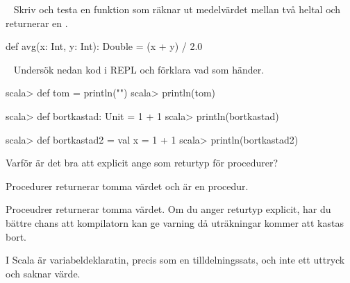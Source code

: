 \SubtaskSolved  {}

\QUESTEND






\QUESTBEGIN

\Task  \what~ Skriv och testa en funktion  som räknar ut medelvärdet mellan två heltal och returnerar en .

\SOLUTION

\TaskSolved \what

\begin{Code}
def avg(x: Int, y: Int): Double = (x + y) / 2.0
\end{Code}


\QUESTEND






\AdvancedTasks %



\QUESTBEGIN

\Task  \what~ Undersök nedan kod i REPL och förklara vad som händer.

\Subtask
\begin{REPL}
scala> def tom = println("")
scala> println(tom)
\end{REPL}

\Subtask
\begin{REPL}
scala> def bortkastad: Unit = 1 + 1
scala> println(bortkastad)
\end{REPL}

\Subtask
\begin{REPL}
scala> def bortkastad2 = { val x = 1 + 1 }
scala> println(bortkastad2)
\end{REPL}

\Subtask Varför är det bra att explicit ange  som returtyp för procedurer?

\SOLUTION


\TaskSolved \what


\SubtaskSolved Procedurer returnerar tomma värdet och  är en procedur.

\SubtaskSolved Proceudrer returnerar tomma värdet. Om du anger returtyp  explicit, har du bättre chans att kompilatorn kan ge varning då uträkningar kommer att kastas bort.

\SubtaskSolved I Scala är variabeldeklaratin, precis som en tilldelningssats, och inte ett uttryck och saknar värde.

